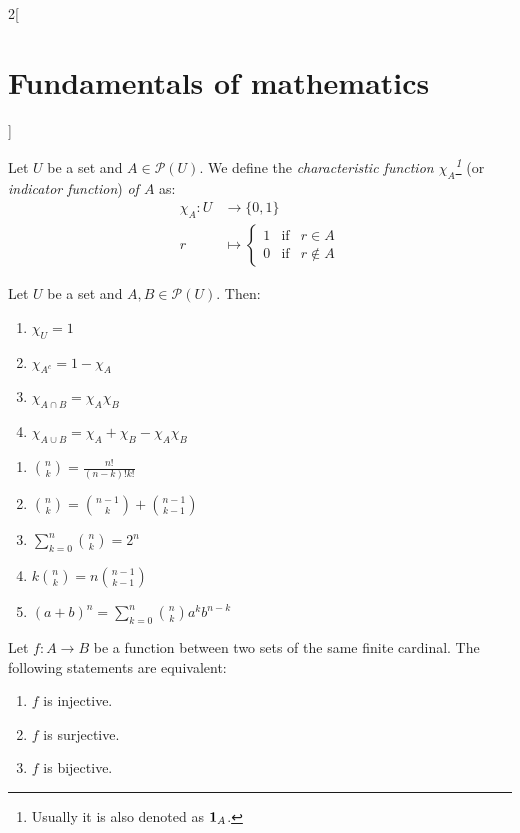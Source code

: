 \documentclass[../../../main.tex]{subfiles}
\begin{document}
\begin{multicols}{2}[\section{Fundamentals of mathematics}]
  \begin{definition}
    Let $U$ be a set and $A\in\mathcal{P}(U)$. We define the \textit{characteristic function $\chi_A$\footnote{Usually it is also denoted as $\boldsymbol{\mathrm{1}}_A$.}} (or \textit{indicator function}) \textit{of $A$} as:
    \begin{align*}
      \chi_A:U & \longrightarrow\{0,1\} \\
      r        & \longmapsto \left\{
      \begin{array}{rcl}
        1 & \text{if} & r\in A    \\
        0 & \text{if} & r\notin A
      \end{array}\right.
    \end{align*}
  \end{definition}
  \begin{prop}
    Let $U$ be a set and $A,B\in\mathcal{P}(U)$. Then:
    \begin{enumerate}
      \item $\chi_U=1$
      \item $\chi_{A^c}=1-\chi_A$
      \item $\chi_{A\cap B}=\chi_A\chi_B$
      \item $\chi_{A\cup B}=\chi_A+\chi_B-\chi_A\chi_B$
    \end{enumerate}
  \end{prop}
  \begin{prop}\hfill
    \begin{enumerate}
      \item $\binom{n}{k}=\frac{n!}{(n-k)!k!}$
      \item $\binom{n}{k}=\binom{n-1}{k}+\binom{n-1}{k-1}$
      \item $\sum_{k=0}^n\binom{n}{k}=2^n$
      \item $k\binom{n}{k}=n\binom{n-1}{k-1}$
      \item $(a+b)^n=\sum_{k=0}^n\binom{n}{k}a^kb^{n-k}$
    \end{enumerate}
  \end{prop}
  \begin{prop}
    Let $f:A\rightarrow B$ be a function between two sets of the same finite cardinal. The following statements are equivalent:
    \begin{enumerate}
      \item $f$ is injective.
      \item $f$ is surjective.
      \item $f$ is bijective.
    \end{enumerate}

\end{prop}
\end{multicols}
\end{document}
